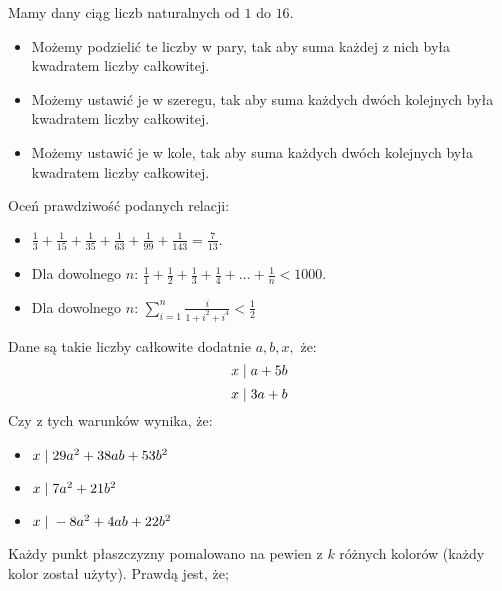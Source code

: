 \documentclass[12pt, a4paper]{article}
\newcommand{\question}[1]{\normalitem \begin{samepage}#1 \end{samepage}}
\newcommand{\questionwithasterix}[1]{ \asterixitem \begin{samepage}#1 \vspace{6cm}\end{samepage}}
\begin{document}
\begin{enumerate}
	\question {
		Mamy dany ciąg liczb naturalnych od $1$ do $16$.

		\begin{itemize}
			\item Możemy podzielić te liczby w pary, tak aby suma każdej z nich była kwadratem liczby całkowitej.
			\item Możemy ustawić je w szeregu, tak aby suma każdych dwóch kolejnych była kwadratem liczby całkowitej.
			\item Możemy ustawić je w kole, tak aby suma każdych dwóch kolejnych była kwadratem liczby całkowitej.
		\end{itemize}
	}
	
	\questionwithasterix {
		Oceń prawdziwość podanych relacji:

		\begin{itemize}
			\item $\frac{1}{3} + \frac{1}{15} + \frac{1}{35} + \frac{1}{63} + \frac{1}{99} + \frac{1}{143} = \frac{7}{13}$.
			\item Dla dowolnego $n$: $\frac{1}{1} + \frac{1}{2} + \frac{1}{3} + \frac{1}{4} + \ldots + \frac{1}{n} < 1000$.
			\item Dla dowolnego $n$: $\sum_{i=1}^n \frac{i}{1+i^2+i^4} < \frac{1}{2}$ 
		\end{itemize}
	}
	
	\question{
		Dane są takie liczby całkowite dodatnie $a, b, x,$ że:
        $$x \hspace{0.1cm} | \hspace{0.1cm} a+5b$$
        $$x \hspace{0.1cm} | \hspace{0.1cm} 3a+b $$
        Czy z tych warunków wynika, że:
        
		\begin{itemize}
			\item $x \hspace{0.1cm} | \hspace{0.1cm} 29a^2+38ab+53b^2$
			\item $x \hspace{0.1cm} | \hspace{0.1cm} 7a^2+21b^2$
			\item $x \hspace{0.1cm} | \hspace{0.1cm} -8a^2+4ab+22b^2$
		\end{itemize}
	}
	
	\questionwithasterix{
		Każdy punkt płaszczyzny pomalowano na pewien z $k$ różnych kolorów
        (każdy kolor został użyty). Prawdą jest, że;
        
}
\end{enumerate}
\end{document}
